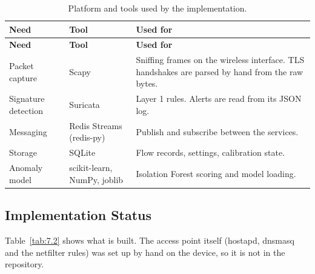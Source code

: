 {\small
\begin{longtable}{|>{\raggedright\arraybackslash}p{}|>{\raggedright\arraybackslash}p{}|>{\raggedright\arraybackslash}p{}|}
\caption{Platform and tools used by the implementation.}\label{tab:7.1}\\
\hline
\textbf{Need} & \textbf{Tool} & \textbf{Used for} \\ \hline
\endfirsthead
\hline
\textbf{Need} & \textbf{Tool} & \textbf{Used for} \\ \hline
\endhead
Packet capture & Scapy & Sniffing frames on the wireless interface. TLS handshakes are parsed by hand from the raw bytes. \\ \hline
Signature detection & Suricata & Layer 1 rules. Alerts are read from its JSON log. \\ \hline
Messaging & Redis Streams (redis-py) & Publish and subscribe between the services. \\ \hline
Storage & SQLite & Flow records, settings, calibration state. \\ \hline
Anomaly model & scikit-learn, NumPy, joblib & Isolation Forest scoring and model loading. \\ \hline
\end{longtable}
}

\subsection{Implementation Status}\label{sec:7.1.2}

\noindent Table~\ref{tab:7.2} shows what is built. The access point itself (hostapd, dnsmasq and the netfilter rules) was set up by hand on the device, so it is not in the repository.

